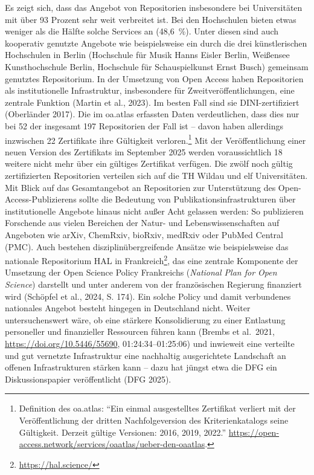 \documentclass[a4paper,
fontsize=11pt,
oneside,
numbers=noperiodatend,
parskip=half-,
bibliography=totoc,
final
]{scrartcl}
\begin{document}
Es zeigt sich, dass das Angebot von Repositorien insbesondere bei
Universitäten mit über 93 Prozent sehr weit verbreitet ist. Bei den
Hochschulen bieten etwas weniger als die Hälfte solche Services an
(48,6~\%). Unter diesen sind auch kooperativ genutzte Angebote wie
beispielsweise ein durch die drei künstlerischen Hochschulen in Berlin
(Hochschule für Musik Hanns Eisler Berlin, Weißensee Kunsthochschule
Berlin, Hochschule für Schauspielkunst Ernst Busch) gemeinsam genutztes
Repositorium. In der Umsetzung von Open Access haben Repositorien als
institutionelle Infrastruktur, insbesondere für Zweitveröffentlichungen,
eine zentrale Funktion (Martin et al., 2023). Im besten Fall sind sie
DINI-zertifiziert (Oberländer 2017). Die im oa.atlas erfassten Daten
verdeutlichen, dass dies nur bei 52 der insgesamt 197 Repositorien der
Fall ist -- davon haben allerdings inzwischen 22 Zertifikate ihre
Gültigkeit verloren.\footnote{Definition des oa.atlas: \enquote{Ein
  einmal ausgestelltes Zertifikat verliert mit der Veröffentlichung der
  dritten Nachfolgeversion des Kriterienkatalogs seine Gültigkeit.
  Derzeit gültige Versionen: 2016, 2019, 2022.}
  \url{https://open-access.network/services/oaatlas/ueber-den-oaatlas}.}
Mit der Veröffentlichung einer neuen Version des Zertifikats im
September 2025 werden voraussichtlich 18 weitere nicht mehr über ein
gültiges Zertifikat verfügen. Die zwölf noch gültig zertifizierten
Repositorien verteilen sich auf die TH Wildau und elf Universitäten. Mit
Blick auf das Gesamtangebot an Repositorien zur Unterstützung des
Open-Access-Publizierens sollte die Bedeutung von
Publikationsinfrastrukturen über institutionelle Angebote hinaus nicht
außer Acht gelassen werden: So publizieren Forschende aus vielen
Bereichen der Natur- und Lebenswissenschaften auf Angeboten wie arXiv,
ChemRxiv, bioRxiv, medRxiv oder PubMed Central (PMC). Auch bestehen
disziplinübergreifende Ansätze wie beispielsweise das nationale
Repositorium HAL in Frankreich\footnote{\url{https://hal.science/}}, das
eine zentrale Komponente der Umsetzung der Open Science Policy
Frankreichs (\emph{National Plan for Open Science}) darstellt und unter
anderem von der französischen Regierung finanziert wird (Schöpfel et
al., 2024, S. 174). Ein solche Policy und damit verbundenes nationales
Angebot besteht hingegen in Deutschland nicht. Weiter untersuchenswert
wäre, ob eine stärkere Konsolidierung zu einer Entlastung personeller
und finanzieller Ressourcen führen kann (Brembs et al.~2021,
\url{https://doi.org/10.5446/55690}, 01:24:34--01:25:06) und inwieweit
eine verteilte und gut vernetzte Infrastruktur eine nachhaltig
ausgerichtete Landschaft an offenen Infrastrukturen stärken kann -- dazu
hat jüngst etwa die DFG ein Diskussionspapier veröffentlicht (DFG 2025).
\end{document}
